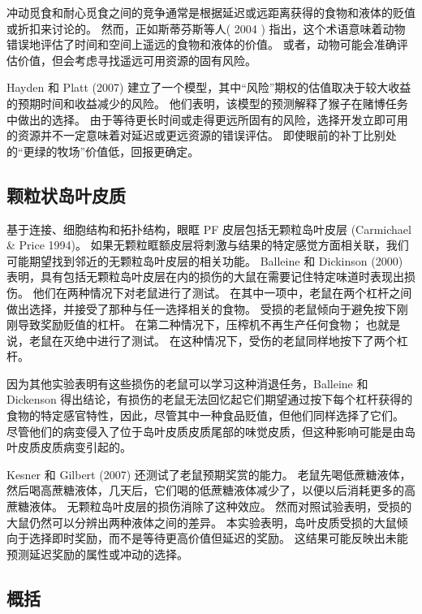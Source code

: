 冲动觅食和耐心觅食之间的竞争通常是根据延迟或远距离获得的食物和液体的贬值或折扣来讨论的。
然而，正如斯蒂芬斯等人( 2004 ) 指出，这个术语意味着动物错误地评估了时间和空间上遥远的食物和液体的价值。
或者，动物可能会准确评估价值，但会考虑寻找遥远可用资源的固有风险。 \par


Hayden 和 Platt (2007) 建立了一个模型，其中“风险”期权的估值取决于较大收益的预期时间和收益减少的风险。
他们表明，该模型的预测解释了猴子在赌博任务中做出的选择。
由于等待更长时间或走得更远所固有的风险，选择开发立即可用的资源并不一定意味着对延迟或更远资源的错误评估。
即使眼前的补丁比别处的“更绿的牧场”价值低，回报更确定。



\subsection{颗粒状岛叶皮质}

基于连接、细胞结构和拓扑结构，眼眶 PF 皮层包括无颗粒岛叶皮层 (Carmichael \& Price 1994)。
如果无颗粒眶额皮层将刺激与结果的特定感觉方面相关联，我们可能期望找到邻近的无颗粒岛叶皮层的相关功能。
Balleine 和 Dickinson (2000) 表明，具有包括无颗粒岛叶皮层在内的损伤的大鼠在需要记住特定味道时表现出损伤。
他们在两种情况下对老鼠进行了测试。
在其中一项中，老鼠在两个杠杆之间做出选择，并接受了那种与任一选择相关的食物。
受损的老鼠倾向于避免按下刚刚导致奖励贬值的杠杆。
在第二种情况下，压榨机不再生产任何食物；
也就是说，老鼠在灭绝中进行了测试。
在这种情况下，受伤的老鼠同样地按下了两个杠杆。\par


因为其他实验表明有这些损伤的老鼠可以学习这种消退任务，Balleine 和 Dickenson 得出结论，有损伤的老鼠无法回忆起它们期望通过按下每个杠杆获得的食物的特定感官特性，因此，尽管其中一种食品贬值，但他们同样选择了它们。
尽管他们的病变侵入了位于岛叶皮质皮质尾部的味觉皮质，但这种影响可能是由岛叶皮质皮质病变引起的。\par


Kesner 和 Gilbert (2007) 还测试了老鼠预期奖赏的能力。
老鼠先喝低蔗糖液体，然后喝高蔗糖液体，几天后，它们喝的低蔗糖液体减少了，以便以后消耗更多的高蔗糖液体。
无颗粒岛叶皮层的损伤消除了这种效应。
然而对照试验表明，受损的大鼠仍然可以分辨出两种液体之间的差异。
本实验表明，岛叶皮质受损的大鼠倾向于选择即时奖励，而不是等待更高价值但延迟的奖励。
这结果可能反映出未能预测延迟奖励的属性或冲动的选择。\par



\subsection{概括}

